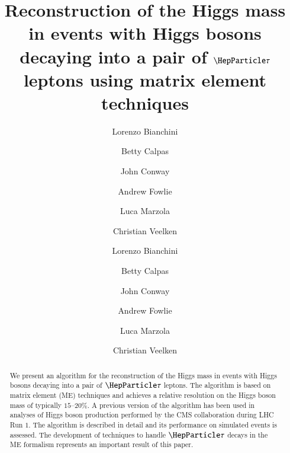 \documentclass[a4paper,english,11pt]{article}
\begin{document}
\ifx\ver\verPAPER
\begin{frontmatter}
\fi

\title{Reconstruction of the Higgs mass in events with Higgs bosons
  decaying into a pair of $\Pgt$ leptons using matrix element techniques}


\ifx\ver\verPreprint
\author[1]{Lorenzo Bianchini}
\author[2]{Betty Calpas}
\author[3]{John Conway}
\author[4]{Andrew Fowlie}
\author[2, 5]{Luca Marzola}
\author[6]{Christian Veelken}
\fi
\ifx\ver\verPAPER
\author[eth]{Lorenzo Bianchini}
\author[tallinn]{Betty Calpas}
\author[ucd]{John Conway}
\author[melb]{Andrew Fowlie}
\author[tartu]{Luca Marzola}
\author[tallinn]{Christian Veelken}
\address[eth]{Institute for Particle Physics, ETH Zurich, 8093 Zurich, Switzerland}
\address[ucd]{Department of Physics, University of California, Davis, CA 95616}
\address[tallinn]{National Institute for Chemical Physics and Biophysics, 10143 Tallinn, Estonia}
\address[tartu]{Institute of Physics, University of Tartu, 51014 Tartu, Estonia}
\address[melb]{ARC Centre of Excellence for Particle Physics at the Tera-scale, Monash University, Melbourne, Victoria 3800, Australia}
\fi

\ifx\ver\verPreprint
\maketitle
\fi

\begin{abstract}
We present an algorithm for the reconstruction of the Higgs mass in events with Higgs bosons decaying into a pair of $\Pgt$ leptons.
The algorithm is based on matrix element (ME) techniques and achieves
a relative resolution on the Higgs boson mass of typically $15$--$20\%$.
A previous version of the algorithm has been used in analyses of Higgs
boson production performed by the CMS collaboration during LHC Run
$1$.
The algorithm is described in detail and its performance on simulated
events is assessed.
The development of techniques to handle $\Pgt$ decays in the ME
formalism represents an important result of this paper.
\end{abstract}

\ifx\ver\verPAPER
\end{frontmatter}
\fi
\end{document}
